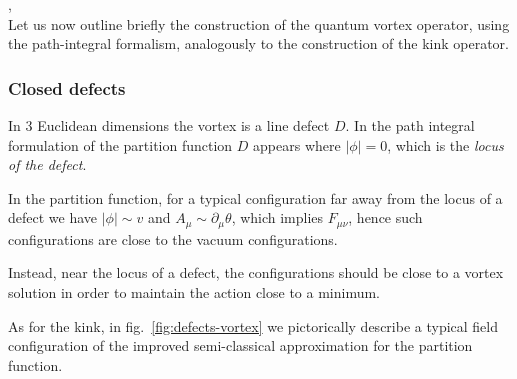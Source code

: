 \documentclass[../main/main.tex]{subfiles}
\begin{document}
\cite{Frohlich:1988qh}, \cite{Frohlich:1987er}\\

Let us now outline briefly the construction of the quantum vortex operator, using the path-integral formalism, analogously to the construction of the kink operator. 

\subsubsection{Closed defects}

In 3 Euclidean dimensions the vortex is a line defect $D$. In the path integral formulation of the partition function $D$ appears where $|\phi|=0$, which is the \emph{locus of the defect}. 

In the partition function, for a typical configuration far away from the locus of a defect we have $|\phi|\sim v$ and $A_\mu\sim\partial_\mu\theta$, which implies $F_{\mu\nu}$, hence such configurations are close to the vacuum configurations. 

Instead, near the locus of a defect, the configurations should be close to a vortex solution in order to maintain the action close to a minimum. 

As for the kink, in fig.~\ref{fig:defects-vortex} we pictorically describe a typical field configuration of the improved semi-classical approximation for the partition function. 
\end{document}
